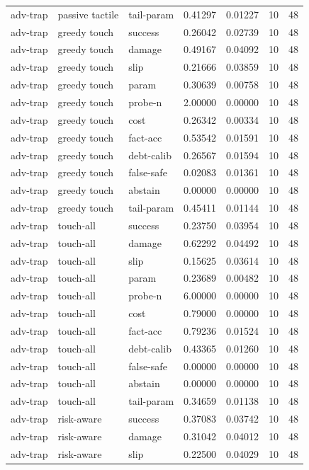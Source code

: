 \documentclass{article}
\begin{document}
\begin{center}
\begin{longtable}{lllllll}
adv-trap & passive tactile & tail-param & 0.41297 & 0.01227 & 10 & 48 \\
adv-trap & greedy touch & success & 0.26042 & 0.02739 & 10 & 48 \\
adv-trap & greedy touch & damage & 0.49167 & 0.04092 & 10 & 48 \\
adv-trap & greedy touch & slip & 0.21666 & 0.03859 & 10 & 48 \\
adv-trap & greedy touch & param & 0.30639 & 0.00758 & 10 & 48 \\
adv-trap & greedy touch & probe-n & 2.00000 & 0.00000 & 10 & 48 \\
adv-trap & greedy touch & cost & 0.26342 & 0.00334 & 10 & 48 \\
adv-trap & greedy touch & fact-acc & 0.53542 & 0.01591 & 10 & 48 \\
adv-trap & greedy touch & debt-calib & 0.26567 & 0.01594 & 10 & 48 \\
adv-trap & greedy touch & false-safe & 0.02083 & 0.01361 & 10 & 48 \\
adv-trap & greedy touch & abstain & 0.00000 & 0.00000 & 10 & 48 \\
adv-trap & greedy touch & tail-param & 0.45411 & 0.01144 & 10 & 48 \\
adv-trap & touch-all & success & 0.23750 & 0.03954 & 10 & 48 \\
adv-trap & touch-all & damage & 0.62292 & 0.04492 & 10 & 48 \\
adv-trap & touch-all & slip & 0.15625 & 0.03614 & 10 & 48 \\
adv-trap & touch-all & param & 0.23689 & 0.00482 & 10 & 48 \\
adv-trap & touch-all & probe-n & 6.00000 & 0.00000 & 10 & 48 \\
adv-trap & touch-all & cost & 0.79000 & 0.00000 & 10 & 48 \\
adv-trap & touch-all & fact-acc & 0.79236 & 0.01524 & 10 & 48 \\
adv-trap & touch-all & debt-calib & 0.43365 & 0.01260 & 10 & 48 \\
adv-trap & touch-all & false-safe & 0.00000 & 0.00000 & 10 & 48 \\
adv-trap & touch-all & abstain & 0.00000 & 0.00000 & 10 & 48 \\
adv-trap & touch-all & tail-param & 0.34659 & 0.01138 & 10 & 48 \\
adv-trap & risk-aware & success & 0.37083 & 0.03742 & 10 & 48 \\
adv-trap & risk-aware & damage & 0.31042 & 0.04012 & 10 & 48 \\
adv-trap & risk-aware & slip & 0.22500 & 0.04029 & 10 & 48 \\
\bottomrule
\end{longtable}
\renewcommand{\arraystretch}{1.0}
\end{center}
\end{document}
